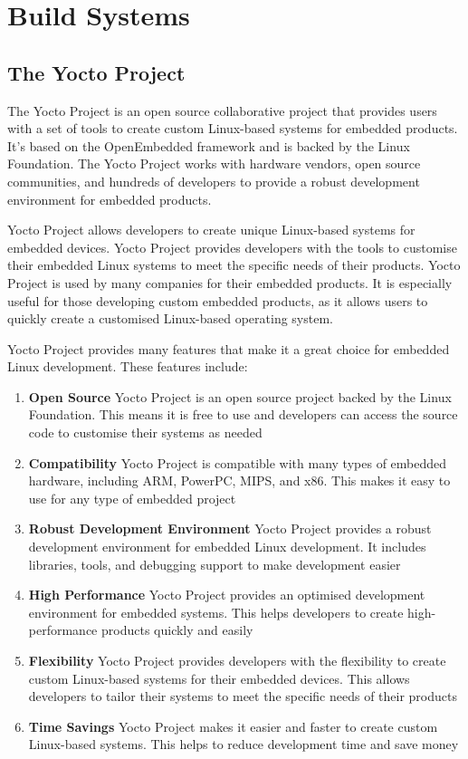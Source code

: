 \chapter{Build Systems} \label{buildsystems}

\section{The Yocto Project}

The Yocto Project is an open source collaborative project that provides users with a set of tools to create custom Linux-based systems for embedded products. It's based on the OpenEmbedded framework and is backed by the Linux Foundation. The Yocto Project works with hardware vendors, open source communities, and hundreds of developers to provide a robust development environment for embedded products.

Yocto Project allows developers to create unique Linux-based systems for embedded devices. Yocto Project provides developers with the tools to customise their embedded Linux systems to meet the specific needs of their products. Yocto Project is used by many companies for their embedded products. It is especially useful for those developing custom embedded products, as it allows users to quickly create a customised Linux-based operating system.

Yocto Project provides many features that make it a great choice for embedded Linux development. These features include:

\begin{enumerate}
	\item \textbf{Open Source} Yocto Project is an open source project backed by the Linux Foundation. This means it is free to use and developers can access the source code to customise their systems as needed
	\item \textbf{Compatibility} Yocto Project is compatible with many types of embedded hardware, including ARM, PowerPC, MIPS, and x86. This makes it easy to use for any type of embedded project
	\item \textbf{Robust Development Environment} Yocto Project provides a robust development environment for embedded Linux development. It includes libraries, tools, and debugging support to make development easier
	\item \textbf{High Performance} Yocto Project provides an optimised development environment for embedded systems. This helps developers to create high-performance products quickly and easily
	\item \textbf{Flexibility} Yocto Project provides developers with the flexibility to create custom Linux-based systems for their embedded devices. This allows developers to tailor their systems to meet the specific needs of their products
	\item \textbf{Time Savings} Yocto Project makes it easier and faster to create custom Linux-based systems. This helps to reduce development time and save money
\end{enumerate}